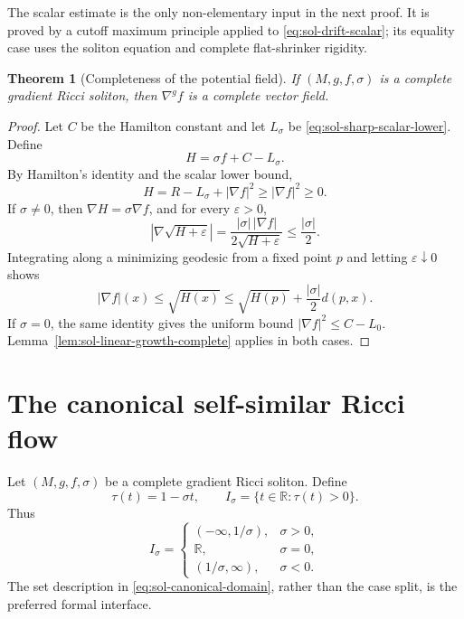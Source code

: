 \documentclass[10pt]{coll-l}
\newtheorem{theorem}{Theorem}[chapter]
\theoremstyle{definition}
\theoremstyle{remark}
\numberwithin{section}{chapter}
\numberwithin{equation}{chapter}
\begin{document}
The scalar estimate is the only non-elementary input in the next proof.  It
is proved by a cutoff maximum principle applied to
\eqref{eq:sol-drift-scalar}; its equality case uses the soliton equation and
complete flat-shrinker rigidity.

\begin{theorem}[Completeness of the potential field]
\label{thm:sol-potential-field-complete}
If $(M,g,f,\sigma)$ is a complete gradient Ricci soliton, then $\nabla^gf$
is a complete vector field.
\end{theorem}

\begin{proof}
Let $C$ be the Hamilton constant and let $L_\sigma$ be
\eqref{eq:sol-sharp-scalar-lower}.  Define
\[
                    H=\sigma f+C-L_\sigma.
\]
By Hamilton's identity and the scalar lower bound,
\[
       H=R-L_\sigma+|\nabla f|^2\geq|\nabla f|^2\geq0.
\]
If $\sigma\ne0$, then $\nabla H=\sigma\nabla f$, and for every
$\varepsilon>0$,
\[
 |\nabla\sqrt{H+\varepsilon}|
   =\frac{|\sigma|\,|\nabla f|}{2\sqrt{H+\varepsilon}}
   \leq\frac{|\sigma|}{2}.
\]
Integrating along a minimizing geodesic from a fixed point $p$ and letting
$\varepsilon\downarrow0$ shows
\[
 |\nabla f|(x)\leq\sqrt{H(x)}
     \leq\sqrt{H(p)}+\frac{|\sigma|}{2}d(p,x).
\]
If $\sigma=0$, the same identity gives the uniform bound
$|\nabla f|^2\leq C-L_0$.  Lemma~\ref{lem:sol-linear-growth-complete}
applies in both cases.
\end{proof}

\section{The canonical self-similar Ricci flow}
\label{sec:sol-canonical}

Let $(M,g,f,\sigma)$ be a complete gradient Ricci soliton.  Define
\begin{equation}
 \tau(t)=1-\sigma t,\qquad
 I_\sigma=\{t\in\mathbb R:\tau(t)>0\}.                   \label{eq:sol-canonical-domain}
\end{equation}
Thus
\[
 I_\sigma=
 \begin{cases}
 (-\infty,1/\sigma),&\sigma>0,\\
 \mathbb R,&\sigma=0,\\
 (1/\sigma,\infty),&\sigma<0.
 \end{cases}
\]
The set description in \eqref{eq:sol-canonical-domain}, rather than the
case split, is the preferred formal interface.
\end{document}
